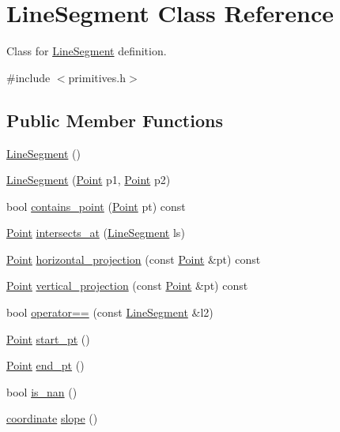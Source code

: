 \hypertarget{class_line_segment}{}\section{Line\+Segment Class Reference}
\label{class_line_segment}


Class for \mbox{\hyperlink{class_line_segment}{Line\+Segment}} definition.  




{\ttfamily \#include $<$primitives.\+h$>$}

\subsection*{Public Member Functions}
\begin{DoxyCompactItemize}
\item 
\mbox{\hyperlink{class_line_segment_a4c2da2ff2d3979f28bfcb24948a8e6a9}{Line\+Segment}} ()
\item 
\mbox{\hyperlink{class_line_segment_a691e185edf3aa7e2dc12307f9ef4be6b}{Line\+Segment}} (\mbox{\hyperlink{class_point}{Point}} p1, \mbox{\hyperlink{class_point}{Point}} p2)
\item 
bool \mbox{\hyperlink{class_line_segment_a8dc46fa1dd259befff8cea92232e2a29}{contains\+\_\+point}} (\mbox{\hyperlink{class_point}{Point}} pt) const
\item 
\mbox{\hyperlink{class_point}{Point}} \mbox{\hyperlink{class_line_segment_a3bdc73ce4696a76b7c7dd143556c95b6}{intersects\+\_\+at}} (\mbox{\hyperlink{class_line_segment}{Line\+Segment}} ls)
\item 
\mbox{\hyperlink{class_point}{Point}} \mbox{\hyperlink{class_line_segment_a25c84a7d07cfd4b594a0fd7b2b37dd18}{horizontal\+\_\+projection}} (const \mbox{\hyperlink{class_point}{Point}} \&pt) const
\item 
\mbox{\hyperlink{class_point}{Point}} \mbox{\hyperlink{class_line_segment_ad057b30e155ee8a82c7aa425ba22682e}{vertical\+\_\+projection}} (const \mbox{\hyperlink{class_point}{Point}} \&pt) const
\item 
bool \mbox{\hyperlink{class_line_segment_ae73906b7230adbccf243c4b8dc6482b3}{operator==}} (const \mbox{\hyperlink{class_line_segment}{Line\+Segment}} \&l2)
\item 
\mbox{\hyperlink{class_point}{Point}} \mbox{\hyperlink{class_line_segment_a63afdd3fd0d5a3dc145109a5fe7231c6}{start\+\_\+pt}} ()
\item 
\mbox{\hyperlink{class_point}{Point}} \mbox{\hyperlink{class_line_segment_a7af4d5a73aa4f89275cda6ea2b5cfbb2}{end\+\_\+pt}} ()
\item 
bool \mbox{\hyperlink{class_line_segment_a3364f7089cf7b650efe389475ddd0f12}{is\+\_\+nan}} ()
\item 
\mbox{\hyperlink{primitives_8h_a9949b5198385a93773b854932cb22e08}{coordinate}} \mbox{\hyperlink{class_line_segment_ad13450e781bedc9ee838726cb57efabb}{slope}} ()
\end{DoxyCompactItemize}


